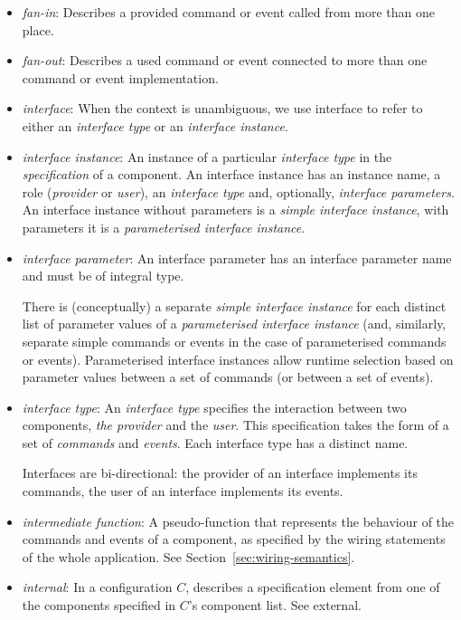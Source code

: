 \documentclass[11pt]{article}
\begin{document}
\begin{itemize}
\item \emph{fan-in}: Describes a provided command or event called from more
than one place.

\item \emph{fan-out}: Describes a used command or event connected to more
than one command or event implementation.

\item \emph{interface}: When the context is unambiguous, we use interface
to refer to either an \emph{interface type} or an \emph{interface instance}.

\item \emph{interface instance}: An instance of a particular
\emph{interface type} in the \emph{specification} of a component. An
interface instance has an instance name, a role (\emph{provider} or
\emph{user}), an \emph{interface type} and, optionally, \emph{interface
parameters}. An interface instance without parameters is a \emph{simple
interface instance}, with parameters it is a \emph{parameterised interface
instance}.

\item \emph{interface parameter}: An interface parameter has an interface
parameter name and must be of integral type. 

There is (conceptually) a separate \emph{simple interface instance} for
each distinct list of parameter values of a \emph{parameterised interface
instance} (and, similarly, separate simple commands or events in the case
of parameterised commands or events). Parameterised interface instances
allow runtime selection based on parameter values between a set of commands
(or between a set of events).

\item \emph{interface type}: An \emph{interface type} specifies the
interaction between two components, \emph{the provider} and the
\emph{user}. This specification takes the form of a set of \emph{commands}
and \emph{events}. Each interface type has a distinct name. 

Interfaces are bi-directional: the provider of an interface implements its
commands, the user of an interface implements its events.

\item \emph{intermediate function}: A pseudo-function that represents the
behaviour of the commands and events of a component, as specified by the
wiring statements of the whole application. See
Section~\ref{sec:wiring-semantics}.

\item \emph{internal}: In a configuration $C$, describes a specification
element from one of the components specified in $C$'s component list. See
external.


\end{itemize}
\end{document}

